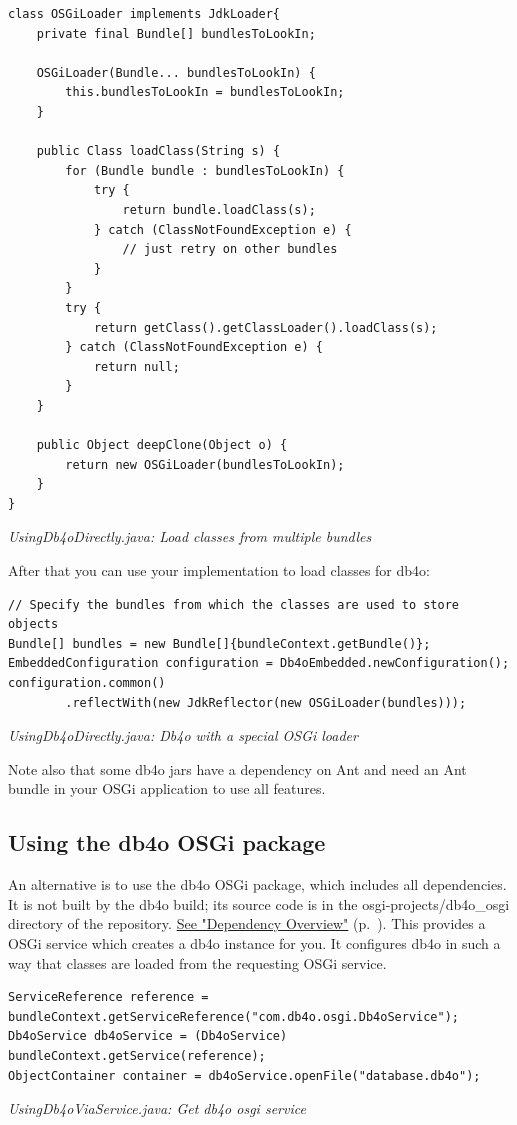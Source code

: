 \begin{lstlisting}
class OSGiLoader implements JdkLoader{
    private final Bundle[] bundlesToLookIn;

    OSGiLoader(Bundle... bundlesToLookIn) {
        this.bundlesToLookIn = bundlesToLookIn;
    }

    public Class loadClass(String s) {
        for (Bundle bundle : bundlesToLookIn) {
            try {
                return bundle.loadClass(s);
            } catch (ClassNotFoundException e) {
                // just retry on other bundles
            }
        }
        try {
            return getClass().getClassLoader().loadClass(s);
        } catch (ClassNotFoundException e) {
            return null;
        }
    }

    public Object deepClone(Object o) {
        return new OSGiLoader(bundlesToLookIn);
    }
}
\end{lstlisting}

{\small\itshape UsingDb4oDirectly.java: Load classes from multiple bundles\par}
\medskip

After that you can use your implementation to load classes for db4o:

\begin{lstlisting}
// Specify the bundles from which the classes are used to store objects
Bundle[] bundles = new Bundle[]{bundleContext.getBundle()};
EmbeddedConfiguration configuration = Db4oEmbedded.newConfiguration();
configuration.common()
        .reflectWith(new JdkReflector(new OSGiLoader(bundles)));
\end{lstlisting}

{\small\itshape UsingDb4oDirectly.java: Db4o with a special OSGi loader\par}
\medskip

Note also that some db4o jars have a dependency on Ant and need an Ant bundle in your OSGi application to use all features.

\subsection*{Using the db4o OSGi package}

An alternative is to use the db4o OSGi package, which includes all dependencies. It is not built by the db4o build; its source code is in the osgi-projects/db4o\_osgi directory of the repository. \hyperref[ref:dependency-overview]{See "Dependency Overview"} (p.~\pageref{ref:dependency-overview}). This provides a OSGi service which creates a db4o instance for you. It configures db4o in such a way that classes are loaded from the requesting OSGi service.

\begin{lstlisting}
ServiceReference reference = bundleContext.getServiceReference("com.db4o.osgi.Db4oService");
Db4oService db4oService = (Db4oService) bundleContext.getService(reference);
ObjectContainer container = db4oService.openFile("database.db4o");
\end{lstlisting}

{\small\itshape UsingDb4oViaService.java: Get db4o osgi service\par}
\medskip

